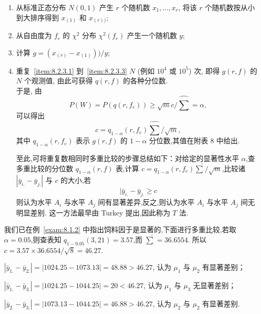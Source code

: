 \begin{enumerate}[label=\color{structurecolor}(\arabic*)]
  \item 从标准正态分布 $N(0,1)$ 产生 $r$ 个随机数 $x_1,\ldots, x_r$, 将该 $r$ 个随机数按从小到大排序得到 $x_{(1)}$ 和 $x_{(r))}$; \label{item:8.2.3.1}
  \item 从自由度为 $f_e$ 的 $\chi^2$ 分布 $\chi^2(f_e)$ 产生一个随机数 $y$; \label{item:8.2.3.2}
  \item 计算 $g =(x_{(r)}-x_{(1)}))/y$; \label{item:8.2.3.3}
  \item 重复~\ref{item:8.2.3.1} 到~\ref{item:8.2.3.3} $N$ (例如 $10^4$ 或 $10^5$) 次, 即得 $g(r,f)$ 的 $N$ 个观测值, 由此可获得 $q(r,f)$ 的各种分位数.\\
  于是, 由
  \begin{equation}\label{eq:8.2.3}
    P(W) = P(q(r,f_e)) \geq \sqrt{m} c/\hat{\sum} = \alpha,
  \end{equation}
  可以得出
  \begin{equation}\label{eq:8.2.4}
    c = q_{1-\alpha}(r,f_e) \hat{\sum}/\sqrt{m},
  \end{equation}
  其中 $q_{1-\alpha}(r,f_e)$ 表示 $g(r,f)$ 的 $1-\alpha$ 分位数,其值在附表 8 中给出.

至此,可将重复数相同时多重比较的步骤总结如下：对给定的显著性水平 $\alpha$,查多重比较的分位数 $q_{1-\alpha}(r,f)$ 表,计算 $c = q_{1-\alpha}(r,f_e)\hat{\sum}/\sqrt{m}$,比较诸 $|\bar{y}_{i.} - \bar{y}_{j.}|$ 与 $c$ 的大小,若
\begin{equation*}
  |\bar{y}_{i.} - \bar{y}_{j.} \geq c
\end{equation*}
则认为水平 $A_i$ 与水平 $A_j$ 间有显著差异,反之,则认为水平 $A_i$ 与水平 $A_j$ 间无明显差别. 这一方法最早由 Turkey 提出,因此称为 $T$ 法.
\end{enumerate}

\begin{example}
  我们已在例~\ref{exam:8.1.2} 中指出饲料因于是显著的,下面进行多重比较,若取 $\alpha=0.05$,则查表知 $q_{1-0.05}(3,21)=3.57$,而 $\hat{\sum} = 36.6554$. 所以 $c = 3.57 \times 36.6554/\sqrt{8} = 46.27$.
\end{example}

$\left|\bar{y}_{1.}-\bar{y}_{2.}\right|=|1024.25-1073.13|=48.88>46.27$, 认为 $\mu_1$ 与 $\mu_2$ 有显著差别；

$\left|\bar{y}_{1.}-\bar{y}_{3.}\right|=|1024.25-1044.25|=20<46.27$, 认为 $\mu_1$ 与 $\mu_3$ 无显著差别；

$\left|\bar{y}_{2.}-\bar{y}_{3.}\right|=|1073.13-1044.25|=46.88>46.27$, 认为 $\mu_2$ 与 $\mu_2$ 有显著差别.

